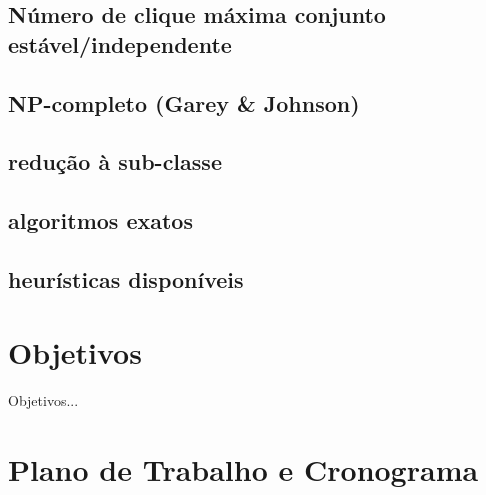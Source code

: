 \documentclass[12pt]{article}
\begin{document}

\subsection{Número de clique máxima conjunto estável/independente}





\subsection{NP-completo (Garey \& Johnson)}

\subsection{redução à sub-classe}

\subsection{algoritmos exatos}

\subsection{heurísticas disponíveis}


\section{Objetivos}
\label{sec:objetivos}

Objetivos...

\section{Plano de Trabalho e Cronograma}
\label{sec:plano}
\end{document}
